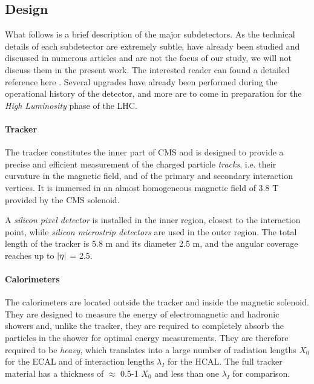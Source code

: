 \subsection{Design}

What follows is a brief description of the major subdetectors. As the technical details of each subdetector are extremely subtle, have already been studied and discussed in numerous articles and are not the focus of our study, we will not discuss them in the present work. The interested reader can found a detailed reference here \cite{Collaboration_2008}. Several upgrades have already been performed during the operational history of the detector, and more are to come in preparation for the \emph{High Luminosity} phase of the LHC.

\paragraph{Tracker}

The tracker constitutes the inner part of CMS and is designed to provide a precise
and efficient measurement of the charged particle \emph{tracks}, i.e. their curvature in the magnetic field, and of the primary and secondary
interaction vertices. It is immersed in an almost homogeneous magnetic field of 3.8 T provided by the CMS solenoid.

A \emph{silicon pixel detector} is installed in the inner region, closest to the interaction point, while \emph{silicon
microstrip detectors} are used in the outer region. The total length of the tracker is 5.8 m
and its diameter 2.5 m, and the angular coverage reaches up to $\abs{\eta}$ = 2.5. 

\paragraph{Calorimeters}

The calorimeters are located outside the tracker and inside the magnetic solenoid. They are
designed to measure the energy of electromagnetic and hadronic showers and, unlike the
tracker, they are required to completely absorb the particles in the shower for optimal energy measurements. They are therefore required to be \emph{heavy}, which translates into a large
number of radiation lengths $X_0$ for the ECAL and of interaction lengths $\lambda_I$ for the HCAL.
The full tracker material has a thickness of $\approx$ 0.5-1 $X_0$ and less than one $\lambda_I$ for comparison.

